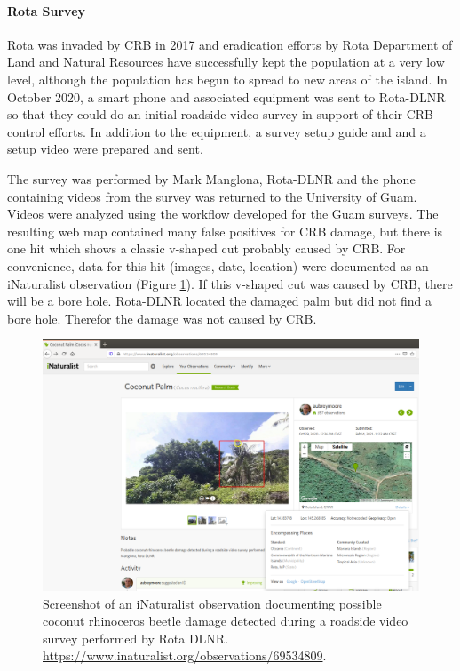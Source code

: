 \documentclass[12pt,letterpaper,english,bibliography=totocnumbered,abstract=on]{scrartcl}
\begin{document}
\clearpage
\paragraph{Rota Survey}

Rota was invaded by CRB in 2017 and eradication efforts by Rota Department of Land and Natural Resources have successfully kept the population at a very low level, although the population has begun to spread to new areas of the island. In October 2020, a smart phone and associated equipment was sent to Rota-DLNR so that they could do an initial roadside video survey in support of their CRB control efforts. In addition to the equipment, a survey setup guide and  \cite{aubreymooreSetAutomatedRoadside2020} and a setup video \cite{mooreYouTubeVideoMounting2020} were prepared and sent.

The survey was performed by Mark Manglona, Rota-DLNR and the phone containing videos from the survey was returned to the University of Guam.  Videos were analyzed using the workflow developed for the Guam surveys. The resulting web map contained many false positives for CRB damage, but there is one hit which shows a classic v-shaped cut probably caused by CRB. For convenience, data for this hit (images, date, location) were documented as an iNaturalist observation (Figure \ref{fig:rota-inat-obs}). If this v-shaped cut was caused by CRB, there will be a bore hole. Rota-DLNR located the damaged palm but did not find a bore hole.  Therefor the damage was not caused by CRB.


\begin{figure}[h]
	\centering
	\includegraphics[width=1\linewidth]{images/Rota-iNat-obs}
	\caption{Screenshot of an iNaturalist observation documenting possible coconut rhinoceros beetle damage detected during a roadside video survey performed by Rota DLNR. \url{https://www.inaturalist.org/observations/69534809}.}
	\label{fig:rota-inat-obs}
\end{figure}
\end{document}
